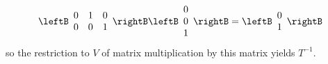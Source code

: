\begin{solution}
\begin{equation*}
\leftB 
\begin{array}{rrr}
0 & 1 & 0 \\ 
0 & 0 & 1
\end{array}
\rightB \leftB 
\begin{array}{c}
0 \\ 
0 \\ 
1
\end{array}
\rightB =\leftB 
\begin{array}{c}
0 \\ 
1
\end{array}
\rightB
\end{equation*}
so the restriction to $V$ of matrix multiplication by this matrix yields $
T^{-1}.$  
\end{solution}
